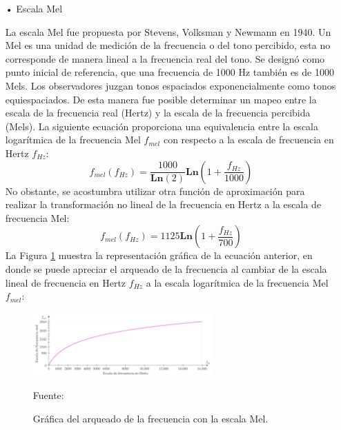 \begin{enumerate}
\begin{enumerate}
\item[•]Escala Mel
\par
La escala Mel fue propuesta por Stevens, Volksman y Newmann en 1940. Un Mel es una unidad de medición de la frecuencia o del tono percibido, esta no corresponde de manera lineal a la frecuencia real del tono. Se designó como punto inicial de referencia, que una frecuencia de 1000 Hz también es de 1000 Mels. 
\vskip 0.5cm
Los observadores juzgan tonos espaciados exponencialmente como tonos equiespaciados. De esta manera fue posible determinar un mapeo entre la escala de la frecuencia real (Hertz) y la escala de la frecuencia percibida (Mels).
\vskip 0.5cm
La siguiente ecuación proporciona una equivalencia entre la escala logarítmica de la frecuencia Mel $f_{mel}$ con respecto a la escala de frecuencia en Hertz $f_{Hz}$:
\begin{equation}
\label{eq:ecuacion47}
f_{mel}(f_{Hz}) = \frac{1000}{\mathbf{Ln}(2)}\mathbf{Ln}\left ( 1 + \frac{f_{Hz}}{1000} \right )
\end{equation}
No obstante, se acostumbra utilizar otra función de aproximación para realizar la transformación no lineal de la frecuencia en Hertz a la escala de frecuencia Mel:
\begin{equation}
\label{eq:ecuacion48}
f_{mel}(f_{Hz}) = 1125\mathbf{Ln}\left ( 1 + \frac{f_{Hz}}{700} \right )
\end{equation}
La Figura \ref{fig:figura2.40} muestra la representación gráfica de la ecuación anterior, en donde se puede apreciar el arqueado de la frecuencia al cambiar de la escala lineal de frecuencia en Hertz $f_{Hz}$ a la escala logarítmica de la frecuencia Mel $f_{mel}$:
\begin{figure}[H]
\begin{center}
\includegraphics[width=0.65\textwidth]{Imagenes/Cap2/image041}
\end{center}
\begin{center}
\vskip -0.5cm
\caption{\small{Gráfica del arqueado de la frecuencia con la escala Mel.}}
\label{fig:figura2.40}
{\small{Fuente: \cite{eyra}}}
\end{center}
\end{figure}


\end{enumerate}
\end{enumerate}
